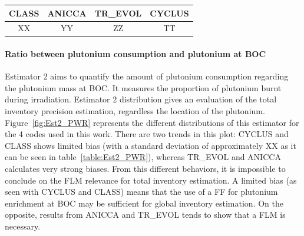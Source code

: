 \begin{table}[h]
	\begin{center}
		\begin{tabular}{|c||c||c||c|}
			\hline 
				CLASS & ANICCA & TR\_EVOL & CYCLUS \\
			\hline
				XX & YY & ZZ & TT \\
		\end{tabular}
	\end{center}
	\label{table:Est1_PWR}
\end{table}

\paragraph{Ratio between plutonium consumption and plutonium at \gls{BOC}}

Estimator 2 aims to quantify the amount of plutonium consumption regarding the
plutonium mass at \gls{BOC}. It measures the proportion of plutonium burnt
during irradiation. Estimator 2 distribution gives an evaluation of the total
inventory precision estimation, regardless the location of the plutonium.
Figure~\ref{fig:Est2_PWR} represents the different distributions of this estimator
for the 4 codes used in this work. There are two trends in this plot: CYCLUS and
CLASS shows limited bias (with a standard deviation of approximately XX as it
can be seen in table~\ref{table:Est2_PWR}), whereas TR\_EVOL and ANICCA
calculates very strong biases. From this different behaviors, it is impossible
to conclude on the \gls{FLM} relevance for total inventory estimation. A limited bias
(as seen with CYCLUS and CLASS) means that the use of a \gls{FF} for plutonium
enrichment at \gls{BOC} may be sufficient for global inventory estimation. On the
opposite, results from ANICCA and TR\_EVOL tends to show that a \gls{FLM} is
necessary. 

